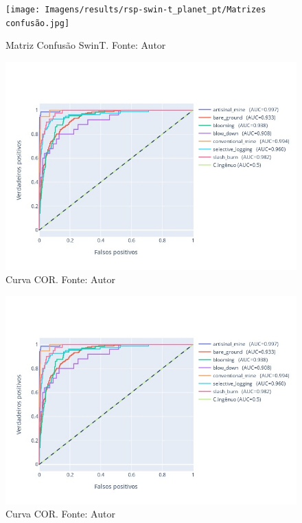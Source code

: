 \begin{figure}[!ht]
    \centering
    \texttt{[image: Imagens/results/rsp-swin-t\_planet\_pt/Matrizes confusão.jpg]}
    \caption{ Matriz Confusão SwinT. Fonte: Autor}
    \label{fig:Matriz Confusao SwinT}
\end{figure}  

\begin{figure}[!ht]
    \centering
    \includegraphics[width=\columnwidth]{Imagens/results/rsp-swin-t_planet_pt/Curva COR para classes raras.jpg}
    \caption{ Curva COR.
    Fonte: Autor}
   \label{fig:AnexosCurvaCORResnet50}
\end{figure}    

\begin{figure}[!ht]
    \centering
    \includegraphics[width=\columnwidth]{Imagens/results/rsp-swin-t_planet_pt/Curva COR para classes raras.jpg}        
    \caption{ Curva COR.
    Fonte: Autor}
   \label{fig:AnexosCurvaCORSwint}
\end{figure}    

